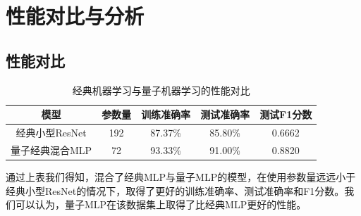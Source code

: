 \documentclass[10pt,a4paper,twoside]{article}
\numberwithin{figure}{section}%
\numberwithin{table}{section}%
\begin{document}

\section{性能对比与分析}

\subsection{性能对比}

\begin{table}[H]
    \centering
    \caption{经典机器学习与量子机器学习的性能对比}
    \label{tab:Performance Comparison of Classical and Quantum Models}
    \begin{tabular}{ccccc}
        \toprule
        \textbf{模型} & \textbf{参数量} & \textbf{训练准确率} & \textbf{测试准确率} & \textbf{测试F1分数} \\
        \midrule
        经典小型ResNet & 192 & 87.37\% & 85.80\% & 0.6662 \\
        量子经典混合MLP & 72 & 93.33\% & 91.00\% & 0.8820 \\
        \bottomrule
    \end{tabular}
\end{table}

通过上表我们得知，混合了经典MLP与量子MLP的模型，在使用参数量远远小于经典小型ResNet的情况下，取得了更好的训练准确率、测试准确率和F1分数。我们可以认为，量子MLP在该数据集上取得了比经典MLP更好的性能。
\end{document}
